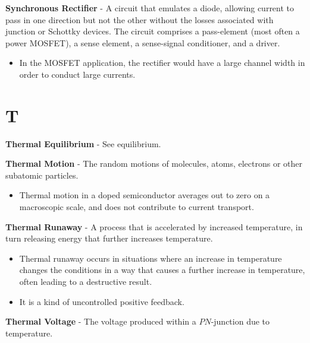 \vspace{0.5cm}
    \textbf{Synchronous Rectifier} - A circuit that emulates a diode, allowing current to pass in one direction but not the other without the losses associated with junction or Schottky devices. The circuit comprises a pass-element (most often a power MOSFET), a sense element, a sense-signal conditioner, and a driver.
    \begin{itemize}
        \setlength\itemsep{0.5em}
        \item{In the MOSFET application, the rectifier would have a large channel width in order to conduct large currents.}
    \end{itemize}
\section{T}
    \textbf{Thermal Equilibrium} - See equilibrium.
\vspace{0.15cm}

    \textbf{Thermal Motion} - The random motions of molecules, atoms, electrons or other subatomic particles.
\vspace{0.15cm}
    \begin{itemize}
        \setlength\itemsep{0.5em}
        \item{Thermal motion in a doped semiconductor averages out to zero on a macroscopic scale, and does not contribute to current transport.}
    \end{itemize}
\vspace{0.5cm}
    \textbf{Thermal Runaway} - A process that is accelerated by increased temperature, in turn releasing energy that further increases temperature.
    \vspace{0.15cm}
    \begin{itemize}
        \setlength\itemsep{0.5em}
        \item{Thermal runaway occurs in situations where an increase in temperature changes the conditions in a way that causes a further increase in temperature, often leading to a destructive result.}
        \item{It is a kind of uncontrolled positive feedback.}
    \end{itemize}
\vspace{0.15cm}
    \textbf{Thermal Voltage} - The voltage produced within a $PN$-junction due to temperature.

